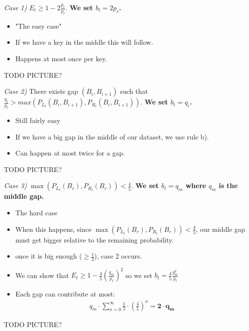 \documentclass{beamer}
\theoremstyle{plain}
\begin{document}
\begin{frame}

\textit{Case 1)} $E_t \geq 1-2 \frac{p_r}{p_t}$. \textbf{We set $b_t = 2p_r$.}


\begin{itemize}
\item "The easy case"
\item If we have a key in the middle this will follow.
\item Happens at most once per key.
\end{itemize}
TODO PICTURE?
\end{frame}
\begin{frame}
\textit{Case 2)} There exists gap $(B_i, B_{i+1})$ such that $\frac{q_i}{p_t} > max(P_{L_t}(B_i, B_{i+1}), P_{R_t}(B_i, B_{i+1}))$. \textbf{We set $b_t = q_i$.}
\begin{itemize}
\item Still fairly easy
\item If we have a big gap in the middle of our dataset, we use rule b).
\item Can happen at most twice for a gap.
\end{itemize}
TODO PICTURE?
\end{frame}

\begin{frame}
\textit{Case 3)} $\max(P_{L_t}(B_r), P_{R_t}(B_r)) < \frac{4}{5}$. \textbf{We set $b_t = q_m$ where $q_m$ is the middle gap.}

\begin{itemize}
\item The hard case
\item When this happens, since $\max(P_{L_t}(B_r), P_{R_t}(B_r)) < \frac{4}{5}$, our middle gap must get bigger relative to the remaining probability.
\item once it is big enough ($\geq \frac{1}{2}$), case 2 occurs.
\item We can show that $E_t \geq 1 - \frac{4}{5}(\frac{q_m}{p_t})^2$ so we set $b_t = \frac{4}{5}\frac{q_m^2}{p_t}$ 
\item Each gap can contribute at most:
\begin{align*}
q_m \cdot \sum\limits_{x=0}^{\infty} \frac{1}{2} \cdot (\frac{4}{5}) ^ x = \mathbf{2 \cdot q_m}
\end{align*}
\end{itemize}
TODO PICTURE?
\end{frame}
\end{document}
